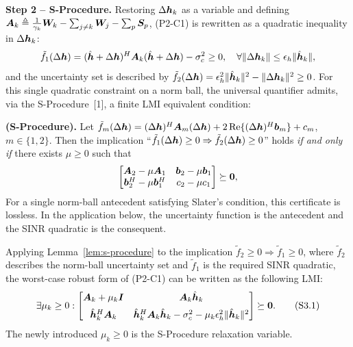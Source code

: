 \textbf{Step 2 -- S-Procedure.} Restoring $\Delta\bm{h}_k$ as a variable and defining $\bm{A}_k \triangleq \frac{1}{\gamma_k} \bm{W}_k - \sum_{j \neq k} \bm{W}_j - \sum_{p} \bm{S}_p$, (P2-C1) is rewritten as a quadratic inequality in $\Delta\bm{h}_k$:
\[
\tilde{f}_1(\Delta\bm{h}) = (\hat{\bm{h}} + \Delta\bm{h})^H \bm{A}_k (\hat{\bm{h}} + \Delta\bm{h}) - \sigma_c^2 \geq 0, \quad \forall \|\Delta\bm{h}_k\| \leq \epsilon_h \|\hat{\bm{h}}_k\|,
\]
and the uncertainty set is described by $\tilde{f}_2(\Delta\bm{h}) = \epsilon_h^2 \|\hat{\bm{h}}_k\|^2 - \|\Delta\bm{h}_k\|^2 \geq 0$. For this single quadratic constraint on a norm ball, the universal quantifier admits, via the S-Procedure~[1], a finite LMI equivalent condition:

\begin{lemma}\textbf{(S-Procedure).}\label{lem:s-procedure}
Let $\tilde{f}_m(\Delta\bm{h}) = (\Delta\bm{h})^H \bm{A}_m (\Delta\bm{h}) + 2\operatorname{Re}\{(\Delta\bm{h})^H \bm{b}_m\} + c_m$, $m \in \{1, 2\}$. Then the implication ``$\tilde{f}_1(\Delta\bm{h}) \geq 0 \Rightarrow \tilde{f}_2(\Delta\bm{h}) \geq 0$'' holds \emph{if and only if} there exists $\mu \geq 0$ such that
\[
\begin{bmatrix} \bm{A}_2 - \mu \bm{A}_1 & \bm{b}_2 - \mu \bm{b}_1 \\ \bm{b}_2^H - \mu \bm{b}_1^H & c_2 - \mu c_1 \end{bmatrix} \succeq \bm{0},
\]
For a single norm-ball antecedent satisfying Slater's condition, this certificate is lossless. In the application below, the uncertainty function is the antecedent and the SINR quadratic is the consequent.
\end{lemma}

Applying Lemma~\ref{lem:s-procedure} to the implication $\tilde{f}_2 \geq 0 \Rightarrow \tilde{f}_1 \geq 0$, where $\tilde{f}_2$ describes the norm-ball uncertainty set and $\tilde{f}_1$ is the required SINR quadratic, the worst-case robust form of (P2-C1) can be written as the following LMI:
\begin{equation}
\exists \mu_k \geq 0: \begin{bmatrix} \bm{A}_k + \mu_k \bm{I} & \bm{A}_k \hat{\bm{h}}_k \\[1.2ex] \hat{\bm{h}}_k^H \bm{A}_k & \hat{\bm{h}}_k^H \bm{A}_k \hat{\bm{h}}_k - \sigma_c^2 - \mu_k \epsilon_h^2 \|\hat{\bm{h}}_k\|^2 \end{bmatrix} \succeq \bm{0}. \tag{S3.1}
\end{equation}
The newly introduced $\mu_k \geq 0$ is the S-Procedure relaxation variable.


